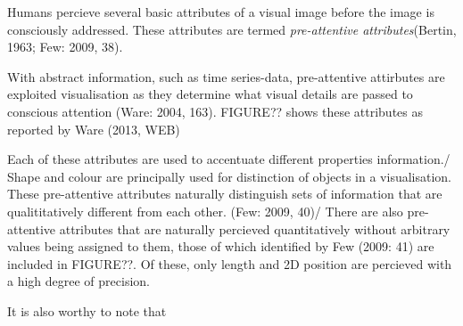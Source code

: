 \documentclass[12pt, a4paper]{report}
\begin{document}
     Humans percieve several basic attributes of a visual image before the image is consciously addressed. These attributes are termed
     \emph{pre-attentive attributes}(Bertin, 1963; Few: 2009, 38).

     With abstract information, such as time series-data, pre-attentive attirbutes are exploited visualisation as they determine what
     visual details are passed to conscious attention (Ware: 2004, 163). FIGURE?? shows these attributes as reported by Ware (2013, WEB)

     Each of these attributes are used to accentuate different properties information./
     Shape and colour are principally used for distinction of objects in a visualisation. These pre-attentive attributes naturally
     distinguish sets of information that are qualititatively different from each other. (Few: 2009, 40)/ %
     There are also pre-attentive attributes that are naturally percieved quantitatively without arbitrary values being assigned to them, those
     of which identified by Few (2009: 41) are included in FIGURE??. Of these, only length and 2D position are percieved with a high degree of precision.

     It is also worthy to note that 
     
 
\end{document}
